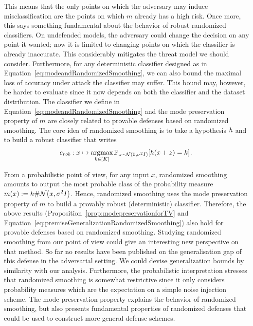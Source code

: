 This means that the only points on which the adversary may induce misclassification are the points on which $m $ already has a high risk. Once more, this says something fundamental about the behavior of robust randomized classifiers. On undefended models, the adversary could change the decision on any point it wanted; now it is limited to changing points on which the classifier is already inaccurate. This considerably mitigates the threat model we should consider. Furthermore, for any deterministic classifier designed as in Equation~\eqref{eq:modeandRandomizedSmoothing}, we can also bound the maximal loss of accuracy under attack the classifier may suffer. This bound may, however, be harder to evaluate since it now depends on both the classifier and the dataset distribution. The classifier we define in Equation~\eqref{eq:modeandRandomizedSmoothing} and the mode preservation property of $m $ are closely related to provable defenses based on randomized smoothing. The core idea of randomized smoothing is to take a hypothesis ${h}$ and to build a robust classifier that writes 
\begin{equation}
    c_{rob}: x  \mapsto \argmaxB\limits_{k \in [K]}\PP_{{z} \sim \mathcal{N}\left(0,\sigma^2 I\right)}\left[\hypothesis(x +{z}) = k\right]\equationspace.
\end{equation}

From a probabilistic point of view, for any input $x $, randomized smoothing amounts to output the most probable class of the probability measure $m (x ) := \hypothesis \# \mathcal{N}\left(x ,\sigma^2 I\right)$.
Hence, randomized smoothing uses the mode preservation property of $m $ to build a provably robust (deterministic) classifier. Therefore, the above results (Proposition~\ref{prop:modepreservationforTV} and Equation~\ref{eq:premiseGeneralizationRandomizedSmoothing}) also hold for provable defenses based on randomized smoothing. Studying randomized smoothing from our point of view could give an interesting new perspective on that method. So far no results have been published on the generalisation gap of this defense in the adversarial setting. We could devise generalization bounds by similarity with our analysis. 
Furthermore, the probabilistic interpretation stresses that randomized smoothing is somewhat restrictive since it only considers probability measures which are the expectation on a simple noise injection scheme.
The mode preservation property explains the behavior of randomized smoothing, but also presents fundamental properties of randomized defenses that could be used to construct more general defense schemes. 


